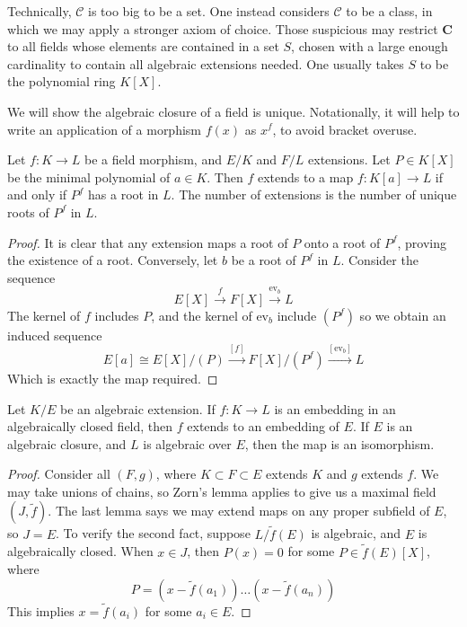 Technically, $\mathcal{C}$ is too big to be a set. One instead considers $\mathcal{C}$ to be a class, in which we may apply a stronger axiom of choice. Those suspicious may restrict $\mathbf{C}$ to all fields whose elements are contained in a set $S$, chosen with a large enough cardinality to contain all algebraic extensions needed. One usually takes $S$ to be the polynomial ring $K[X]$.

We will show the algebraic closure of a field is unique. Notationally, it will help to write an application of a morphism $f(x)$ as $x^f$, to avoid bracket overuse.

\begin{lemma}
    Let $f:K \to L$ be a field morphism, and $E/K$ and $F/L$ extensions. Let $P \in K[X]$ be the minimal polynomial of $a \in K$. Then $f$ extends to a map $f:K[a] \to L$ if and only if $P^f$ has a root in $L$. The number of extensions is the number of unique roots of $P^f$ in $L$.
\end{lemma}
\begin{proof}
    It is clear that any extension maps a root of $P$ onto a root of $P^f$, proving the existence of a root. Conversely, let $b$ be a root of $P^f$ in $L$. Consider the sequence
    \[ E[X] \xrightarrow{f} F[X] \xrightarrow{\text{ev}_b} L \]
    The kernel of $f$ includes $P$, and the kernel of $\text{ev}_b$ include $(P^f)$ so we obtain an induced sequence
    \[ E[a] \cong E[X]/(P) \xrightarrow{[f]} F[X]/(P^f) \xrightarrow{[\text{ev}_b]} L \]
    Which is exactly the map required.
\end{proof}

\begin{theorem}
    Let $K/E$ be an algebraic extension. If $f:K \to L$ is an embedding in an algebraically closed field, then $f$ extends to an embedding of $E$. If $E$ is an algebraic closure, and $L$ is algebraic over $E$, then the map is an isomorphism.
\end{theorem}
\begin{proof}
    Consider all $(F,g)$, where $K \subset F \subset E$ extends $K$ and $g$ extends $f$. We may take unions of chains, so Zorn's lemma applies to give us a maximal field $(J,\tilde{f})$. The last lemma says we may extend maps on any proper subfield of $E$, so $J = E$. To verify the second fact, suppose $L/\tilde{f}(E)$ is algebraic, and $E$ is algebraically closed. When $x \in J$, then $P(x) = 0$ for some $P \in \tilde{f}(E)[X]$, where
    \[ P = (x - \tilde{f}(a_1)) \dots (x - \tilde{f}(a_n)) \]
    This implies $x = \tilde{f}(a_i)$ for some $a_i \in E$.
\end{proof}

